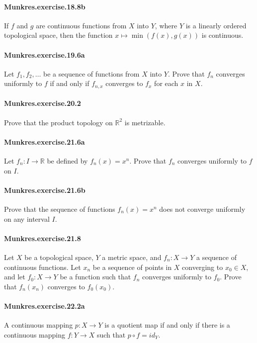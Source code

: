 \documentclass{article}
\begin{document}
\paragraph{Munkres.exercise.18.8b} If $f$ and $g$ are continuous functions from $X$ into $Y$, where $Y$ is a linearly ordered topological space, then the function $x\mapsto \min(f(x), g(x))$ is continuous.

\paragraph{Munkres.exercise.19.6a} Let $f_1, f_2, \dots$ be a sequence of functions from $X$ into $Y$. Prove that $f_n$ converges uniformly to $f$ if and only if $f_{n,x}$ converges to $f_x$ for each $x$ in $X$.

\paragraph{Munkres.exercise.20.2} Prove that the product topology on $\mathbb{R}^2$ is metrizable.

\paragraph{Munkres.exercise.21.6a} Let $f_n:I\to\mathbb{R}$ be defined by $f_n(x)=x^n$. Prove that $f_n$ converges uniformly to $f$ on $I$.

\paragraph{Munkres.exercise.21.6b} Prove that the sequence of functions $f_n(x)=x^n$ does not converge uniformly on any interval $I$.

\paragraph{Munkres.exercise.21.8} Let $X$ be a topological space, $Y$ a metric space, and $f_n:X\to Y$ a sequence of continuous functions. Let $x_n$ be a sequence of points in $X$ converging to $x_0\in X$, and let $f_0:X\to Y$ be a function such that $f_n$ converges uniformly to $f_0$. Prove that $f_n(x_n)$ converges to $f_0(x_0)$.

\paragraph{Munkres.exercise.22.2a} A continuous mapping $p:X\to Y$ is a quotient map if and only if there is a continuous mapping $f:Y\to X$ such that $p\circ f = id_Y$.
\end{document}
